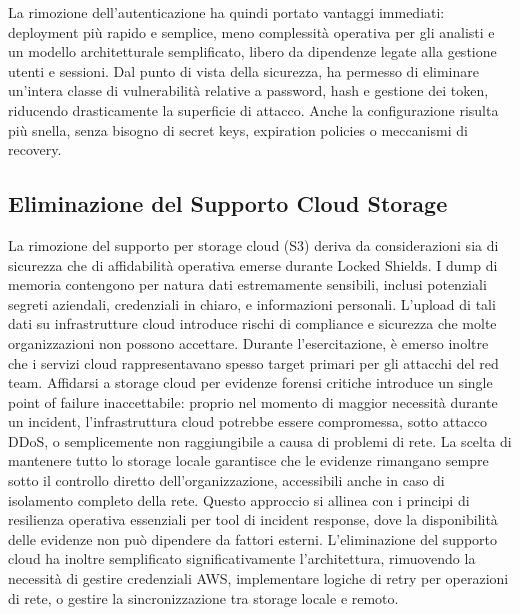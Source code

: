 La rimozione dell’autenticazione ha quindi portato vantaggi immediati: deployment più rapido e semplice, meno complessità operativa per gli analisti e un modello architetturale semplificato, libero da dipendenze legate alla gestione utenti e sessioni. Dal punto di vista della sicurezza, ha permesso di eliminare un’intera classe di vulnerabilità relative a password, hash e gestione dei token, riducendo drasticamente la superficie di attacco. Anche la configurazione risulta più snella, senza bisogno di secret keys, expiration policies o meccanismi di recovery.

\subsection{Eliminazione del Supporto Cloud Storage}
La rimozione del supporto per storage cloud (S3) deriva da considerazioni sia di sicurezza che di affidabilità operativa emerse durante Locked Shields. I dump di memoria contengono per natura dati estremamente sensibili, inclusi potenziali segreti aziendali, credenziali in chiaro, e informazioni personali. L'upload di tali dati su infrastrutture cloud introduce rischi di compliance e sicurezza che molte organizzazioni non possono accettare.
Durante l'esercitazione, è emerso inoltre che i servizi cloud rappresentavano spesso target primari per gli attacchi del red team. Affidarsi a storage cloud per evidenze forensi critiche introduce un single point of failure inaccettabile: proprio nel momento di maggior necessità durante un incident, l'infrastruttura cloud potrebbe essere compromessa, sotto attacco DDoS, o semplicemente non raggiungibile a causa di problemi di rete.
La scelta di mantenere tutto lo storage locale garantisce che le evidenze rimangano sempre sotto il controllo diretto dell'organizzazione, accessibili anche in caso di isolamento completo della rete. Questo approccio si allinea con i principi di resilienza operativa essenziali per tool di incident response, dove la disponibilità delle evidenze non può dipendere da fattori esterni.
L'eliminazione del supporto cloud ha inoltre semplificato significativamente l'architettura, rimuovendo la necessità di gestire credenziali AWS, implementare logiche di retry per operazioni di rete, o gestire la sincronizzazione tra storage locale e remoto.
